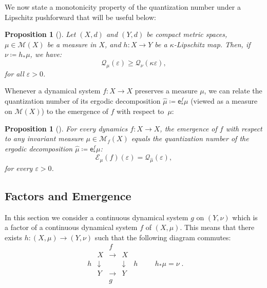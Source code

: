 \documentclass[11pt,reqno]{amsart}
\theoremstyle{plain}
\newtheorem{prop}[theorem]{Proposition}
\theoremstyle{definition}
\theoremstyle{remark}
\theoremstyle{plain}
\numberwithin{equation}{section}
\newcommand{\eps}{\varepsilon}
\newcommand{\qand}{\qquad}
\begin{document}
We now state a monotonicity property of the quantization number under a Lipschitz pushforward that will be useful below:

\begin{prop}[{\cite[Prop. 3.17]{bergerbochi}}]
	\label{quantizacao lipschitz}
	Let $(X,d)$ and $(Y,d)$ be compact metric spaces, $\mu \in \mathcal{M}(X)$ be a measure in $X$, and $h\colon X\to Y$ be a $\kappa$-Lipschitz map. Then, if $\nu\coloneqq h_{\ast}\mu$, we have: $$\mathcal{Q}_{\mu}(\eps)\geq \mathcal{Q}_{\nu}(\kappa\eps),$$ for all $\eps>0$.
\end{prop}



Whenever a dynamical system $f\colon X\to X$ preserves a measure $\mu$, we can relate the quantization number of its ergodic decomposition $\hat{\mu}\coloneqq\mathsf{e}^{f}_{\ast}\mu$ (viewed as a measure on $\mathcal{M}(X)$) to the emergence of $f$ with respect to~$\mu$:

\begin{prop}[{\cite[Prop. 3.12]{bergerbochi}}]
	\label{prop: quantizacao vs emeergencia}
	For every dynamics $f\colon X\to X$, the emergence of $f$ with respect to any invariant measure $\mu \in \mathcal{M}_{f}(X)$ equals the quantization number of the ergodic decomposition $\hat{\mu}\coloneqq \mathsf{e}^{f}_{\ast}\mu$: 
	\begin{equation}\label{eq: emergencia e quantizacao}
		\mathcal{E}_{\mu}(f)(\eps)=\mathcal{Q}_{\hat{\mu}}(\eps),
	\end{equation}
	for every $\eps>0$.
\end{prop}


\subsection{Factors and Emergence} \label{subsection: factors and emergence}
						

In this section we consider a continuous dynamical system $g$ on $(Y,\nu)$ which is a factor of a continuous dynamical system $f$ of $(X,\mu)$. This means that there exists $h: (X,\mu) \to (Y,\nu)$ such that the following diagram commutes:
	\[
         \begin{array} {rcccl}
	& &f& &\\
	& X  &\to & X &\\
	h&\downarrow &  &\downarrow &h\\
	& Y  &\to & Y &\\
	& &g& &\end{array}\qand h_{\ast} \mu = \nu\; . \]
	
\end{document}
